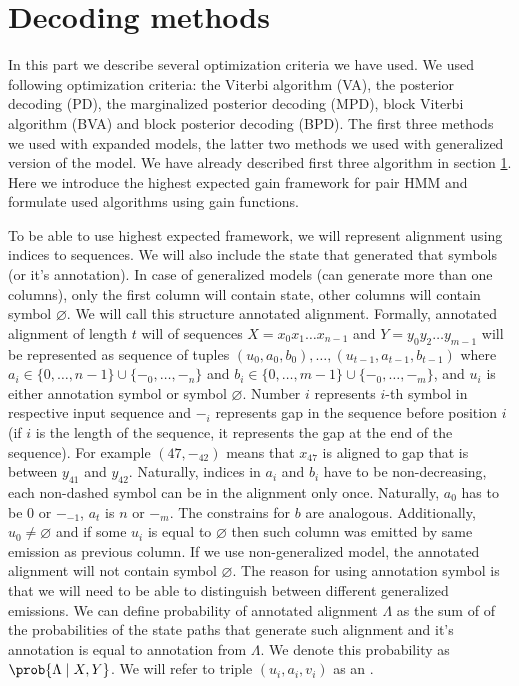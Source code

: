 \section{Decoding methods}

In this part we describe several optimization criteria we have used. We used
following optimization criteria: the Viterbi algorithm (VA), the
posterior decoding (PD), the marginalized posterior decoding (MPD), block
Viterbi algorithm (BVA) and block posterior decoding (BPD). The first three
methods we used with expanded models, the latter two methods we used with
generalized version of the model. We have already described first three
algorithm in section \ref{}. Here we introduce the highest expected gain
framework for pair HMM and formulate used algorithms using gain
functions.

To be able to use highest expected framework, we will represent alignment using
indices to sequences. We will also include the state that generated that
symbols (or it's annotation). In case of generalized models (can generate more
than one columns), only the first column will contain state, other columns will
contain symbol $\varnothing$. We will call this structure annotated alignment.
Formally, annotated alignment of length $t$ will of sequences $X=x_0x_1\dots
x_{n-1}$ and $Y=y_0y_2\dots y_{m-1}$ will be represented as sequence of tuples
$(u_0, a_0, b_0), \dots, (u_{t-1}, a_{t-1}, b_{t-1})$ where $a_i\in \{0, \dots,
{n-1}\}\cup\{-_0, \dots, -_n\}$ and $b_i \in \{0, \dots, m-1\}\cup\{-_0,
\dots, -_m\}$, and $u_i$ is either annotation symbol or symbol $\varnothing$.
Number $i$ represents $i$-th symbol in respective input sequence and $-_i$
represents gap in the sequence before position $i$ (if $i$ is the length of the
sequence, it represents the gap at the end of the sequence). For example $(47,
-_{42})$ means that $x_{47}$ is aligned to gap that is between $y_{41}$ and
$y_{42}$.  Naturally, indices in $a_i$ and $b_i$ have to be non-decreasing,
each non-dashed symbol can be in the alignment only once.  Naturally, $a_0$ has
to be $0$ or $-_{-1}$, $a_t$ is $n$ or $-_m$. The constrains for $b$ are
analogous. Additionally, $u_0\not=\varnothing$ and if some $u_i$ is equal to
$\varnothing$ then such column was emitted by same emission as previous column.
If we use non-generalized model, the annotated alignment will not contain
symbol $\varnothing$. The reason for using annotation symbol is that we will
need to be able to distinguish between different generalized emissions. We can
define probability of annotated alignment $\Lambda$ as the sum of of the
probabilities of the state paths that generate such alignment and it's
annotation is equal to annotation from $\Lambda$. We denote this probability as
$\prob{\Lambda\mid X, Y}$. We will refer to triple $(u_i, a_i, v_i)$ as an
.

